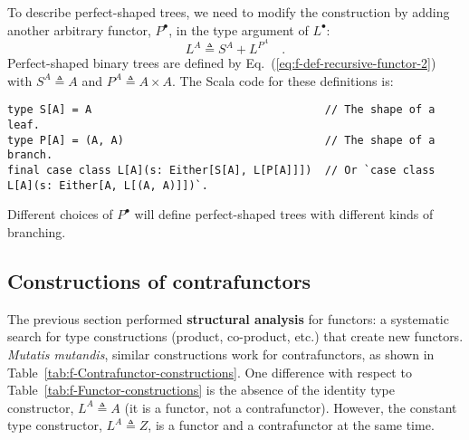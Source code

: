To describe perfect-shaped trees, we need to modify the construction
by adding another arbitrary functor, $P^{\bullet}$, in the type argument
of $L^{\bullet}$:
\begin{equation}
L^{A}\triangleq S^{A}+L^{P^{A}}\quad.\label{eq:f-def-recursive-functor-2}
\end{equation}
Perfect-shaped binary trees are defined by Eq.~(\ref{eq:f-def-recursive-functor-2})
with $S^{A}\triangleq A$ and $P^{A}\triangleq A\times A$. The Scala
code for these definitions is:
\begin{lstlisting}
type S[A] = A                                    // The shape of a leaf.
type P[A] = (A, A)                               // The shape of a branch.
final case class L[A](s: Either[S[A], L[P[A]]])  // Or `case class L[A](s: Either[A, L[(A, A)]])`.
\end{lstlisting}
Different choices of $P^{\bullet}$ will define perfect-shaped trees
with different kinds of branching.

\subsection{Constructions of contrafunctors\label{subsec:f-Contrafunctor-constructions}}

The previous section performed \textbf{structural analysis}
for functors: a systematic search for type constructions (product,
co-product, etc.) that create new functors.\emph{ Mutatis mutandis},
similar constructions work for contrafunctors, as shown in Table~\ref{tab:f-Contrafunctor-constructions}.
One difference with respect to Table~\ref{tab:f-Functor-constructions}
is the absence of the identity type constructor, $L^{A}\triangleq A$
(it is a functor, not a contrafunctor). However, the constant type
constructor, $L^{A}\triangleq Z$, is a functor and a contrafunctor
at the same time.

